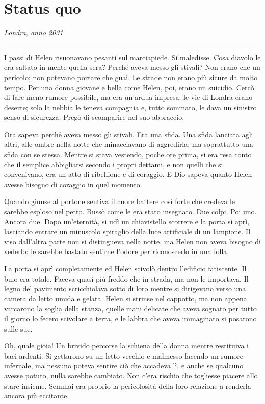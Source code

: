 \chapter{Status quo}
\label{ch:status-quo}

\emph{Londra, anno 2031}
\plainbreak{1}

I passi di Helen risuonavano pesanti sul marciapiede. Si maledisse. Cosa diavolo le era saltato in
mente quella sera? Perché aveva messo gli stivali? Non erano che un pericolo; non potevano portare
che guai. Le strade non erano più sicure da molto tempo. Per una donna giovane e bella come Helen,
poi, erano un suicidio. Cercò di fare meno rumore possibile, ma era un'ardua impresa: le vie di
Londra erano deserte; solo la nebbia le teneva compagnia e, tutto sommato, le dava un sinistro senso
di sicurezza. Pregò di scomparire nel suo abbraccio.

Ora sapeva perché aveva messo gli stivali. Era una sfida. Una sfida lanciata agli altri, alle ombre
nella notte che minacciavano di aggredirla; ma soprattutto una sfida con se stessa. Mentre si stava
vestendo, poche ore prima, si era resa conto che il semplice abbigliarsi secondo i propri dettami, e
non quelli che si convenivano, era un atto di ribellione e di coraggio. E Dio sapeva quanto Helen
avesse bisogno di coraggio in quel momento.

Quando giunse al portone sentiva il cuore battere così forte che credeva le sarebbe esploso nel
petto. Bussò come le era stato insegnato. Due colpi. Poi uno. Ancora due. Dopo un'eternità, si udì
un chiavistello scorrere e la porta si aprì, lasciando entrare un minuscolo spiraglio della luce
artificiale di un lampione. Il viso dall'altra parte non si distingueva nella notte, ma Helen non
aveva bisogno di vederlo: le sarebbe bastato sentirne l'odore per riconoscerlo in una folla.

La porta si aprì completamente ed Helen scivolò dentro l'edificio fatiscente. Il buio era totale.
Faceva quasi più freddo che in strada, ma non le importava. Il legno del pavimento scricchiolava
sotto di loro mentre si dirigevano verso una camera da letto umida e gelata. Helen si strinse nel
cappotto, ma non appena varcarono la soglia della stanza, quelle mani delicate che aveva sognato per
tutto il giorno lo fecero scivolare a terra, e le labbra che aveva immaginato si posarono sulle sue.

Oh, quale gioia! Un brivido percorse la schiena della donna mentre restituiva i baci ardenti. Si
gettarono su un letto vecchio e malmesso facendo un rumore infernale, ma nessuno poteva sentire ciò
che accadeva lì, e anche se qualcuno avesse potuto, nulla sarebbe cambiato. Non c'era rischio che
togliesse piacere allo stare insieme. Semmai era proprio la pericolosità della loro relazione a
renderla ancora più eccitante.

